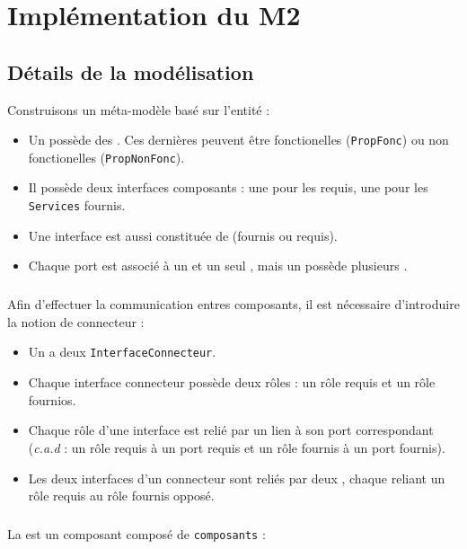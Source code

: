 \chapter{Implémentation du M2}\label{chap:M2}
\section{Détails de la modélisation}
Construisons un méta-modèle basé sur l'entité \composant :
\begin{itemize}
\item 
  Un \composant{} possède des \proprietes{}. Ces dernières peuvent être fonctionelles (\verb+PropFonc+) ou non fonctionelles (\verb+PropNonFonc+).
\item 
  Il possède deux interfaces composants :  une pour les \services{} requis, une pour les \verb+Services+ fournis.
\item
  Une interface est aussi constituée de \ports{} (fournis ou requis). 
\item
  Chaque port est associé à un et un seul \service, mais un \service{} possède plusieurs \ports.  
\end{itemize}


\paragraph{}
Afin d'effectuer la communication entres composants, il est nécessaire d'introduire la notion de connecteur :

\begin{itemize}
\item 
  Un \connecteur{} a deux \verb+InterfaceConnecteur+.
\item
  Chaque interface connecteur possède deux rôles : un rôle requis \roler{} et un rôle fournios\rolef{}.
\item
  Chaque rôle d'une interface est relié par un lien \attachement{} à son port correspondant (\textit{c.a.d }: un rôle requis à un port requis et un rôle fournis à un port fournis).  
\item
  Les deux interfaces d'un connecteur sont reliés par deux \glu{}, chaque \glu{} reliant un rôle requis au rôle fournis opposé.
\end{itemize}

\paragraph{}

La \configuration{} est un composant composé de \verb+composants+ : 

